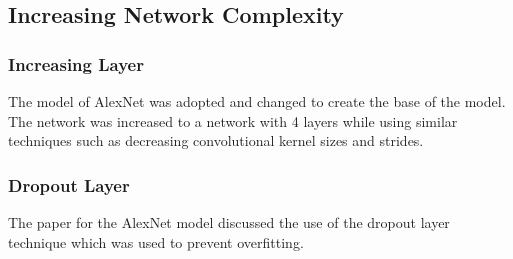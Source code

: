 \documentclass[../main.tex]{subfiles}
\begin{document}
\subsection{Increasing Network Complexity}
\subsubsection{Increasing Layer}

The model of AlexNet was adopted and changed to create the base of the model. The network was increased to a network with 4 layers while using similar techniques such as decreasing convolutional kernel sizes and strides. 

\subsubsection{Dropout Layer}

The paper for the AlexNet model discussed the use of the dropout layer technique which was used to prevent overfitting. 
\end{document}
